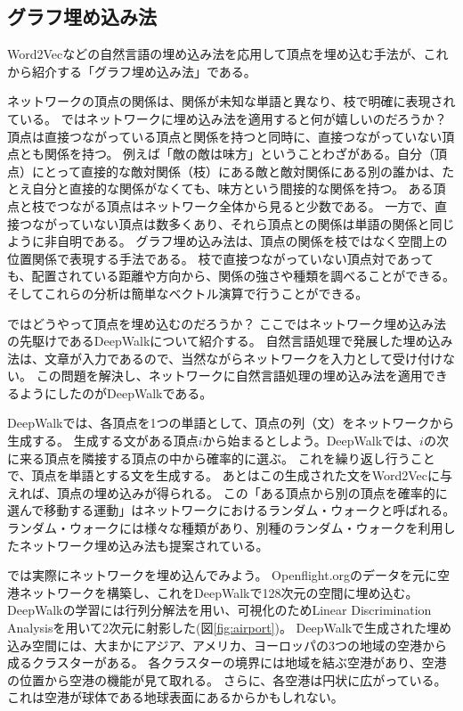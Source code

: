 \documentclass[J]{scitrans}
\begin{document}
\subsection{グラフ埋め込み法}

Word2Vecなどの自然言語の埋め込み法を応用して頂点を埋め込む手法が、これから紹介する「グラフ埋め込み法」である。

ネットワークの頂点の関係は、関係が未知な単語と異なり、枝で明確に表現されている。
ではネットワークに埋め込み法を適用すると何が嬉しいのだろうか？
頂点は直接つながっている頂点と関係を持つと同時に、直接つながっていない頂点とも関係を持つ。
例えば「敵の敵は味方」ということわざがある。自分（頂点）にとって直接的な敵対関係（枝）にある敵と敵対関係にある別の誰かは、たとえ自分と直接的な関係がなくても、味方という間接的な関係を持つ。
ある頂点と枝でつながる頂点はネットワーク全体から見ると少数である。
一方で、直接つながっていない頂点は数多くあり、それら頂点との関係は単語の関係と同じように非自明である。
グラフ埋め込み法は、頂点の関係を枝ではなく空間上の位置関係で表現する手法である。
枝で直接つながっていない頂点対であっても、配置されている距離や方向から、関係の強さや種類を調べることができる。
そしてこれらの分析は簡単なベクトル演算で行うことができる。

ではどうやって頂点を埋め込むのだろうか？
ここではネットワーク埋め込み法の先駆けであるDeepWalkについて紹介する。
自然言語処理で発展した埋め込み法は、文章が入力であるので、当然ながらネットワークを入力として受け付けない。
この問題を解決し、ネットワークに自然言語処理の埋め込み法を適用できるようにしたのがDeepWalk\cite{Bryan2014}である。

DeepWalkでは、各頂点を1つの単語として、頂点の列（文）をネットワークから生成する。
生成する文がある頂点$i$から始まるとしよう。DeepWalkでは、$i$の次に来る頂点を隣接する頂点の中から確率的に選ぶ。
これを繰り返し行うことで、頂点を単語とする文を生成する。
あとはこの生成された文をWord2Vecに与えれば、頂点の埋め込みが得られる。
この「ある頂点から別の頂点を確率的に選んで移動する運動」はネットワークにおけるランダム・ウォークと呼ばれる。
ランダム・ウォークには様々な種類があり、別種のランダム・ウォークを利用したネットワーク埋め込み法も提案されている\cite{Grover2016,Dong2017}。

では実際にネットワークを埋め込んでみよう。
Openflight.orgのデータを元に空港ネットワークを構築し、これをDeepWalkで128次元の空間に埋め込む。
DeepWalkの学習には行列分解法\cite{Qiu2018}を用い、可視化のためLinear Discrimination Analysisを用いて2次元に射影した(図\ref{fig:airport})。
DeepWalkで生成された埋め込み空間には、大まかにアジア、アメリカ、ヨーロッパの3つの地域の空港から成るクラスターがある。
各クラスターの境界には地域を結ぶ空港があり、空港の位置から空港の機能が見て取れる。
さらに、各空港は円状に広がっている。これは空港が球体である地球表面にあるからかもしれない。
%
\end{document}
